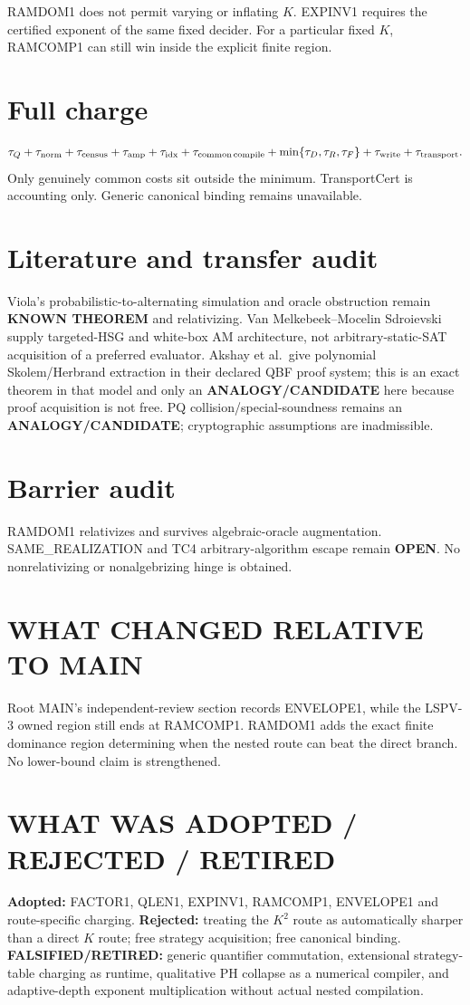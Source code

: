 \documentclass[11pt]{article}
\begin{document}
RAMDOM1 does not permit varying or inflating $K$. EXPINV1 requires the certified exponent of the same fixed decider. For a particular fixed $K$, RAMCOMP1 can still win inside the explicit finite region.

\section*{Full charge}
\[
\tau_Q+\tau_{\rm norm}+\tau_{\rm census}+\tau_{\rm amp}+\tau_{\rm idx}
+\tau_{\rm common\,compile}+\min\{\tau_D,\tau_R,\tau_F\}
+\tau_{\rm write}+\tau_{\rm transport}.
\]
Only genuinely common costs sit outside the minimum. TransportCert is accounting only. Generic canonical binding remains unavailable.

\section*{Literature and transfer audit}
Viola's probabilistic-to-alternating simulation and oracle obstruction remain \textbf{KNOWN THEOREM} and relativizing. Van Melkebeek--Mocelin Sdroievski supply targeted-HSG and white-box AM architecture, not arbitrary-static-SAT acquisition of a preferred evaluator. Akshay et al.\ give polynomial Skolem/Herbrand extraction in their declared QBF proof system; this is an exact theorem in that model and only an \textbf{ANALOGY/CANDIDATE} here because proof acquisition is not free. PQ collision/special-soundness remains an \textbf{ANALOGY/CANDIDATE}; cryptographic assumptions are inadmissible.

\section*{Barrier audit}
RAMDOM1 relativizes and survives algebraic-oracle augmentation. SAME\_REALIZATION and TC4 arbitrary-algorithm escape remain \textbf{OPEN}. No nonrelativizing or nonalgebrizing hinge is obtained.

\section*{WHAT CHANGED RELATIVE TO MAIN}
Root MAIN's independent-review section records ENVELOPE1, while the LSPV-3 owned region still ends at RAMCOMP1. RAMDOM1 adds the exact finite dominance region determining when the nested route can beat the direct branch. No lower-bound claim is strengthened.

\section*{WHAT WAS ADOPTED / REJECTED / RETIRED}
\textbf{Adopted:} FACTOR1, QLEN1, EXPINV1, RAMCOMP1, ENVELOPE1 and route-specific charging.
\textbf{Rejected:} treating the $K^2$ route as automatically sharper than a direct $K$ route; free strategy acquisition; free canonical binding.
\textbf{FALSIFIED/RETIRED:} generic quantifier commutation, extensional strategy-table charging as runtime, qualitative PH collapse as a numerical compiler, and adaptive-depth exponent multiplication without actual nested compilation.
\end{document}
